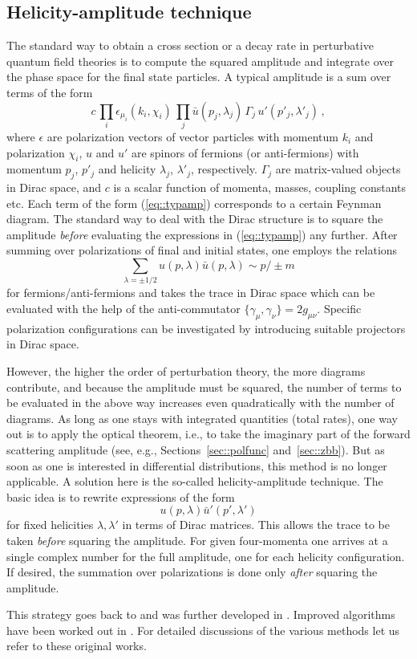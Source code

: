 \subsection{Helicity-amplitude technique\label{sec::helamp}}
The standard way to obtain a cross section or a decay rate in
perturbative quantum field theories is to compute the squared amplitude
and integrate over the phase space for the final state particles. A
typical amplitude is a sum over terms of the form
\begin{equation}
  c\,\prod_i\epsilon_{\mu_i}(k_i,\chi_i)\,\prod_j \bar
  u(p_{j},\lambda_j)\,\Gamma_j\, u'(p'_j,\lambda'_j)\,,
  \label{eq::typamp}
\end{equation}
where $\epsilon$ are polarization vectors of vector particles with
momentum $k_i$ and polarization $\chi_i$, $u$ and $u'$ are spinors of
fermions (or anti-fermions) with momentum $p_j$, $p'_j$ and
helicity $\lambda_j$, $\lambda'_j$, respectively. $\Gamma_j$ are
matrix-valued objects in Dirac space, and $c$ is a scalar function of
momenta, masses, coupling constants etc.  Each term of the form
(\ref{eq::typamp}) corresponds to a certain Feynman diagram.  The
standard way to deal with the Dirac structure is to square the amplitude
{\it before} evaluating the expressions in (\ref{eq::typamp}) any
further. After summing over polarizations of final and initial states, one
employs the relations
\begin{equation}
\sum_{\lambda = \pm 1/2} u(p,\lambda)\bar u(p,\lambda) \sim p\!\!\!/ \pm m
\end{equation}
for fermions/anti-fermions and takes the trace in Dirac space which can
be evaluated with the help of the anti-commutator $\{\gamma_\mu,\gamma_\nu\}
= 2 g_{\mu\nu}$. Specific polarization configurations can be
investigated by introducing suitable projectors in Dirac space. 

However, the higher the order of perturbation theory, the more diagrams
contribute, and because the amplitude must be squared, the number of
terms to be evaluated in the above way increases even quadratically with
the number of diagrams.  As long as one stays with integrated quantities
(total rates), one way out is to apply the optical theorem, i.e., to
take the imaginary part of the forward scattering amplitude (see, e.g.,
Sections~\ref{sec::polfunc} and~\ref{sec::zbb}).
But as soon as one is interested in differential distributions,
this method is no longer applicable. A solution here is the so-called
helicity-amplitude technique. The basic idea is to rewrite
expressions of the form
\begin{equation}
u(p,\lambda)\bar u'(p',\lambda')
\end{equation}
for fixed helicities $\lambda,\lambda'$ in terms of Dirac matrices. This
allows the trace to be taken {\it before} squaring the amplitude. For
given four-momenta one arrives at a single complex number for the full
amplitude, one for each helicity configuration. If desired, the
summation over polarizations is done only {\it after} squaring the
amplitude.

This strategy goes back to \cite{BjoChe66} and was further developed in
\cite{ref::calkul}. Improved algorithms have been worked out in
\cite{ref::helamp,BalMai95}. For detailed discussions of the various
methods let us refer to these original works.


%
%
%
